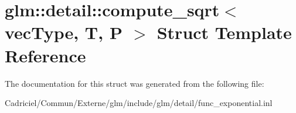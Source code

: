 \hypertarget{structglm_1_1detail_1_1compute__sqrt}{}\section{glm\+:\+:detail\+:\+:compute\+\_\+sqrt$<$ vec\+Type, T, P $>$ Struct Template Reference}
\label{structglm_1_1detail_1_1compute__sqrt}


The documentation for this struct was generated from the following file\+:\begin{DoxyCompactItemize}
\item 
Cadriciel/\+Commun/\+Externe/glm/include/glm/detail/func\+\_\+exponential.\+inl\end{DoxyCompactItemize}

